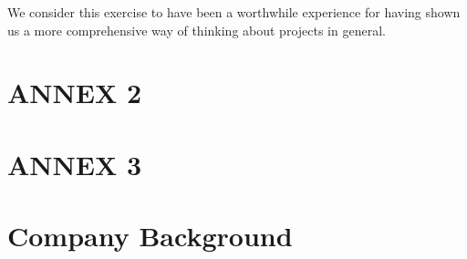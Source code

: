 \documentclass[11pt]{article}
\begin{document}
\noindent We consider this exercise to have been a worthwhile experience for having shown us a more comprehensive way of thinking about projects in general.


\section{ANNEX 2}


\section{ANNEX 3}

\section{Company Background}


\end{document}
